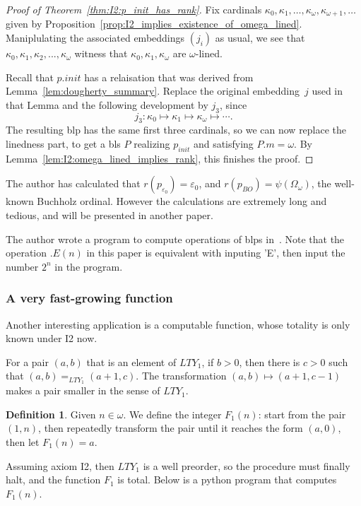 \documentclass{article}
\theoremstyle{definition}
\newtheorem{definition}[lemma]{Definition}
\theoremstyle{remark}
\begin{document}
\begin{proof}[Proof of Theorem~\ref{thm:I2:p_init_has_rank}]
    Fix cardinals $\kappa_0,\kappa_1,\dots, \kappa_\omega,\kappa_{\omega+1},\dots$ given by Proposition~\ref{prop:I2_implies_existence_of_omega_lined}. Maniplulating the associated embeddings $(j_i)$ as usual, we see  that $\kappa_0,\kappa_1,\kappa_2,...,\kappa_\omega$ witness that $\kappa_0,\kappa_1,\kappa_\omega$ are $\omega$-lined. 

    Recall that $p.init$ has a relaisation that was derived from Lemma~\ref{lem:dougherty_summary}. Replace the original embedding~$j$ used in that Lemma and the following development by $j_3$, since 
    \[
      j_3 : \kappa_0 \mapsto \kappa_1 \mapsto \kappa_\omega \mapsto \cdots.
    \]
    The resulting blp has the same first three cardinals, so we can now replace the linedness part, to get a bls $P$ realizing $p_{init}$ and satisfying $P.m = \omega$. By Lemma~\ref{lem:I2:omega_lined_implies_rank}, this finishes the proof.
\end{proof}

The author has calculated that $r(p_{\varepsilon_0})=\varepsilon_0$, and $r(p_{BO})=\psi(\Omega_{\omega})$, the well-known Buchholz ordinal. However the calculations are extremely long and tedious, and will be presented in another paper.

The author wrote a program to compute operations of blps in~\cite{blplink}. Note that the operation $.E(n)$ in this paper is equivalent with inputing 'E', then input the number $2^n$ in the program.


\subsubsection*{A very fast-growing function}

Another interesting application is a computable function, whose totality is only known under I2 now.

For a pair $(a,b)$ that is an element of $LTY_1$, if $b>0$, then there is $c>0$ such that $(a,b)=_{LTY_1}(a+1,c)$. The transformation $(a,b)\mapsto (a+1,c-1)$ makes a pair smaller in the sense of $LTY_1$.

\begin{definition}
  Given $n\in\omega$. We define the integer $F_1(n)$: start from the pair $(1,n)$, then repeatedly transform the pair until it reaches the form $(a,0)$, then let $F_1(n)=a$. 
\end{definition}

Assuming axiom I2, then $LTY_1$ is a well preorder, so the procedure must finally halt, and the function $F_1$ is total. Below is a python program that computes $F_1(n)$.
\end{document}
